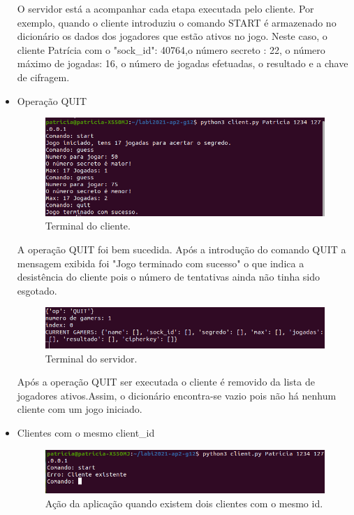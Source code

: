 \documentclass{report}
\begin{document}
\begin{itemize}
O servidor está a acompanhar cada etapa executada pelo cliente. Por exemplo, quando o cliente introduziu o comando START é armazenado no dicionário os dados dos jogadores que estão ativos no jogo. Neste caso, o cliente Patrícia com o "sock\_id": 40764,o número secreto : 22, o número máximo de jogadas: 16, o número de jogadas efetuadas, o resultado e a chave de cifragem.

\item Operação QUIT
\begin{figure}[H]
        \centering
        \includegraphics[scale=0.53]{guesscomquit}      
        \caption{Terminal do cliente.}
\end{figure}

A operação QUIT foi bem sucedida. Após a introdução do comando QUIT a mensagem exibida foi "Jogo terminado com sucesso" o que indica a desistência do cliente pois o número de tentativas ainda não tinha sido esgotado.

\begin{figure}[H]
        \centering
        \includegraphics[scale=0.53]{guesscomquit1}      
        \caption{Terminal do servidor.}
\end{figure}

Após a operação QUIT ser executada o cliente é removido da lista de jogadores ativos.Assim, o dicionário encontra-se vazio pois não há nenhum cliente com um jogo iniciado.

\item Clientes com o mesmo client\_id
\begin{figure}[H]
        \centering
        \includegraphics[scale=0.53]{mesmonome}      
        \caption{Ação da aplicação quando existem dois clientes com o mesmo id.}
\end{figure}


\end{itemize}
\end{document}

